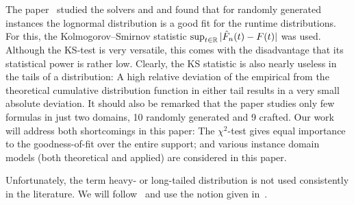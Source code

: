 The paper~\cite{ATCTC13UsingSequentialRuntimeDistributions} studied the 
solvers  and 
and found that for randomly generated instances
the lognormal distribution is a good fit
for the runtime distributions.
For this, the Kolmogorov--Smirnov %
statistic $\sup_{t \in \mathbb{R}} | \hat{F}_n(t) - F(t) |$ was used.
Although the KS-test is very versatile, this comes with the disadvantage that its statistical power is rather low.
Clearly, the KS statistic is also nearly useless in the tails of a distribution: A high relative deviation of the empirical from the theoretical cumulative distribution function in either tail results in a very small absolute deviation.
It should also be remarked that the paper studies only few formulas in just two domains, 10 randomly generated and 9 crafted.
Our work will address both shortcomings in this paper: The $\chi^2$-test gives equal importance to the goodness-of-fit over the entire support; and various instance domain models (both theoretical and applied) are considered in this paper.


\begin{remark*}
	Unfortunately, the term heavy- or long-tailed distribution is not used consistently in the literature.
	We will follow~\cite{foss2011introduction} and use the notion given in~.
\end{remark*}




